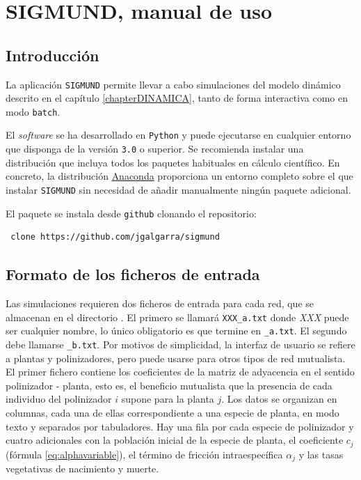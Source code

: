 
\appendix
\renewcommand{\thechapter}{A}
\chapter{SIGMUND, manual de uso} %

\label{APP_SIGMUNDMAN} %

\section{Introducción}

La aplicación \texttt{SIGMUND} permite llevar a cabo simulaciones del modelo dinámico descrito en el capítulo \ref{chapterDINAMICA}, tanto de forma interactiva como en modo \texttt{batch}.

El \textit{software} se ha desarrollado en \texttt{Python} y puede ejecutarse en cualquier entorno que disponga de la versión \texttt{3.0} o superior. Se recomienda instalar una distribución que incluya todos los paquetes habituales en cálculo científico. En concreto, la distribución \href{https://www.continuum.io/}{Anaconda} proporciona un entorno completo sobre el que instalar \texttt{SIGMUND} sin necesidad de añadir manualmente ningún paquete adicional.

El paquete se instala desde \texttt{github} clonando el repositorio:

\fontsize{3.5mm}{3.5mm}\selectfont
\begin{verbatim}
 clone https://github.com/jgalgarra/sigmund 
\end{verbatim}
\normalsize
%
 
\section{Formato de los ficheros de entrada}
\label{sec:ASIGMUNDMAN_input_file_format}

Las simulaciones requieren dos ficheros de entrada para cada red, que se almacenan en el directorio . El primero se llamará \texttt{XXX\_a.txt} donde \textit{XXX} puede ser cualquier nombre, lo único obligatorio es que termine en \texttt{\_a.txt}. El segundo debe llamarse \texttt{\_b.txt}. Por motivos de simplicidad, la interfaz de usuario se refiere a plantas y polinizadores, pero puede usarse para otros tipos de red mutualista.
El primer fichero contiene los coeficientes de la matriz de adyacencia en el sentido polinizador - planta, esto es, el beneficio mutualista que la presencia de cada individuo del polinizador $i$ supone para la planta $j$. Los datos se organizan en columnas, cada una de ellas correspondiente a una especie de planta, en modo texto y separados por tabuladores. Hay una fila por cada especie de polinizador y cuatro adicionales con la población inicial de la especie de planta, el coeficiente $c_{j}$ (fórmula \ref{eq:alphavariable}), el término de fricción intraespecífica $\alpha_{j}$ y las tasas vegetativas de nacimiento y muerte.

